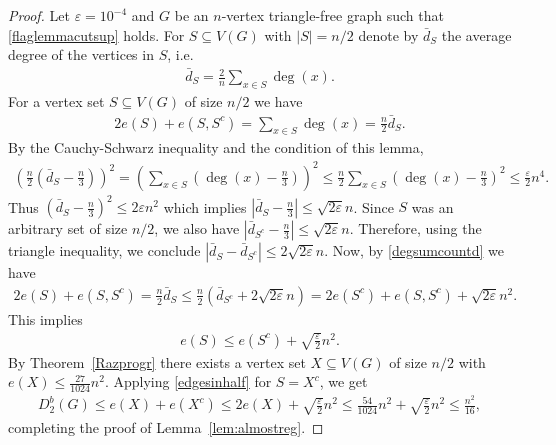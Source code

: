 \documentclass[11pt]{article}
\theoremstyle{definition}
\numberwithin{theo}{section}
\begin{document}
\begin{proof}
Let $\varepsilon=10^{-4}$ and $G$ be an $n$-vertex triangle-free graph such that \eqref{flaglemmacutsup} holds. For $S\subseteq V(G)$ with $|S|=n/2$ denote by $\bar{d}_S$ the average degree of the vertices in $S$, i.e.
\begin{align*}
    \bar{d}_S=\frac{2}{n}\sum_{x\in S}\deg(x).
\end{align*}
For a vertex set $S\subseteq V(G)$ of size $n/2$ we have
\begin{align}
\label{degsumcountd}
    2e(S)+e(S,S^c)=\sum_{x\in S}\deg(x)=\frac{n}{2}\bar{d}_S.
\end{align}
By the Cauchy-Schwarz inequality and the condition of this lemma, 
\begin{align*}
    \left(\frac{n}{2}\left(\bar{d}_S-\frac{n}{3}\right) \right)^2=\left(\sum_{x\in S}\left(\deg(x)-\frac{n}{3}\right) \right)^2\leq \frac{n}{2}\sum_{x\in S}\left(\deg(x)-\frac{n}{3}\right)^2\leq \frac{\varepsilon}{2} n^4.
\end{align*}
Thus $\left(\bar{d}_S-\frac{n}{3}\right)^2\leq 2\varepsilon n^2$
which implies $\left|\bar{d}_S-\frac{n}{3}\right|\leq \sqrt{2\varepsilon} n$. Since $S$ was an arbitrary set of size $n/2$, we also have
$\left|\bar{d}_{S^c}-\frac{n}{3}\right|\leq \sqrt{2\varepsilon} n$. Therefore, using the triangle inequality, we conclude  $\left|\bar{d}_{S}-\bar{d}_{S^c}\right|\leq 2\sqrt{2\varepsilon} n$. Now, by \eqref{degsumcountd} we have
\begin{align*}
    2e(S)+e(S,S^c)=\frac{n}{2}\bar{d}_{S}\leq \frac{n}{2}\left(\bar{d}_{S^c}+2\sqrt{2\varepsilon}n\right)=2e(S^c)+e(S,S^c)+\sqrt{2\varepsilon}n^2.
\end{align*}
This implies
\begin{align}
\label{edgesinhalf}
    e(S)\leq e(S^c)+\sqrt{\frac{\varepsilon}{2}}n^2.
\end{align}
By Theorem~\ref{Razprogr} there exists a vertex set $X\subseteq V(G)$ of size $n/2$ with $e(X)\leq \frac{27}{1024}n^2$. Applying \eqref{edgesinhalf} for $S=X^c$, we get
\begin{align*}
    D_2^b(G)\leq e(X)+e(X^c)\leq 2e(X)+\sqrt{\frac{\varepsilon}{2}}n^2\leq \frac{54}{1024}n^2+\sqrt{\frac{\varepsilon}{2}}n^2\leq \frac{n^2}{16},
\end{align*}
completing the proof of Lemma~\ref{lem:almostreg}.
\end{proof}
\end{document}
